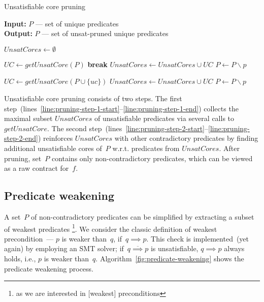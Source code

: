 \begin{algorithm}[tbh]
\caption{Unsatisfiable core pruning}
\label{fig:unsat-core-pruning}

\textbf{Input:}  $P$ --- set of unique predicates\\
\textbf{Output:} $P$ --- set of unsat-pruned unique predicates

\begin{algorithmic}[1]

\State $UnsatCores \leftarrow \emptyset$

 \label{line:pruning-step-1-start}
    \State $UC \leftarrow getUnsatCore(P)$
        \State \textbf{break}
    \EndIf
    \State $UnsatCores \leftarrow UnsatCores \cup UC$
        \State $P \leftarrow P \backslash p$
    \EndFor
\EndWhile \label{line:pruning-step-1-end}

 \label{line:pruning-step-2-start}
    \State $UC \leftarrow getUnsatCore(P \cup \{uc\})$
    \State $UnsatCores \leftarrow UnsatCores \cup UC$
        \State $P \leftarrow P \backslash p$
    \EndFor
\EndFor \label{line:pruning-step-2-end}
\end{algorithmic}
\end{algorithm}

Unsatisfiable core pruning consists of two steps. The first step~(lines~\ref{line:pruning-step-1-start}--\ref{line:pruning-step-1-end}) collects the maximal subset $UnsatCores$ of unsatisfiable predicates via several calls to $getUnsatCore$. The second step~(lines~\ref{line:pruning-step-2-start}--\ref{line:pruning-step-2-end}) reinforces $UnsatCores$ with other contradictory predicates by finding additional unsatisfiable cores of~$P$ w.r.t. predicates from $UnsatCores$. After pruning, set~$P$ contains only non-contradictory predicates, which can be viewed as a raw contract for~$f$.

\subsection{Predicate weakening}

A set~$P$ of non-contradictory predicates can be simplified by extracting a subset of weakest predicates%
\footnote{as we are interested in [weakest] preconditions}.
We consider the classic definition of weakest precondition~--- $p$ is weaker than~$q$, if~$q \implies p$. This check is implemented~(yet again) by employing an SMT solver; if~$\overline{q \implies p}$ is unsatisfiable, $q \implies p$ always holds, i.e., $p$ is weaker than~$q$. Algorithm~\ref{fig:predicate-weakening} shows the predicate weakening process.

